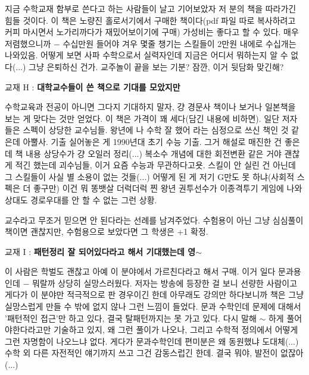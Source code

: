지금 수학교재 함부로 쓴다고 하는 사람들이 날고 기어보았자 저 분의 책을 따라가긴 힘들 것이다.
이 책은 노량진 홀로서기에서 구매한 책이다(pdf 파일 따로 복사하려고 커피 마시면서 노가리까다가 재밌어보이기에 구매)
가성비는 좋다고 할 수 있다. 매우 저렴했으니까 $-$ 수십만원 들어야 겨우 몇줄 챙기는 스킬들이 2만원 내에로 수십개는 나와있음.
어떻게 보면 사파 수학으로서 실력자인데 지금은 어디서 뭐하는지 알 수 없다(...) 그냥 은퇴하신 건가.
교주놀이 끝을 보는 기분?
잠깐, 이거 뒷담화 맞긴해?
\vspace{5mm}

교재 H : \textbf{대학교수들이 쓴 책으로 기대를 모았지만}
\vspace{5mm}

수학교육과 전공이 아니면 그다지 기대하지 말자, 걍 경문사 책이나 보거나 일본책을 보는 게 맞다는 것만 얻었다.
이 책은 가격이 꽤 세다(담긴 내용에 비하면). 일단 저자들은 스펙이 상당한 교수님들.
왕년에 나 수학 잘 했어 라는 심정으로 쓰신 책인 것 같은데 아뿔사.
기출 실어놓은 게 1990년대 초기 수능 기출. 그거 해설로 매진한 건 좋은데 책 내용 상당수가 걍 오일러 정리(...)
복소수 개념에 대한 회전변환 같은 거야 괜찮게 적긴 했는데 괴수님들, 이거 요즘 수능과 무관하다고욧.
스킬이 안 실린 건 아닌데 그 스킬들이 사실 별 소용이 없는 것들(...) 어떻게 된 게 저기 G만도 못 하냐(사회적 스펙은 더 좋구만)
이건 뭐 똥뱃살 더럭더럭 찐 왕년 권투선수가 이종격투기 게임에 나와 상대도 경로우대를 안 할 수 없는 그런 상황.
\vspace{5mm}

교수라고 무조거 믿으면 안 된다라는 선례를 남겨주었다.
수험용이 아닌 그냥 심심풀이 책이면 괜찮지만, 수험용으로 보았다면 그 학생은 +1 확정.
\vspace{5mm}

교재 I : \textbf{패턴정리 잘 되어있다라고 해서 기대했는데 영$\sim$}
\vspace{5mm}

이 사람은 학벌도 괜찮고 아예 이 분야에서 가르친다라고 해서 구매. 이거 일다 문과용인데 $-$
뭐랄까 상당히 실망스러웠다. 저자는 방송에 등장한 걸 보니 선량한 사람이고 게다가 이 분야만 적극적으로 판 경우이긴 한데
아무래도 강의만 하다보니까 책은 그냥 실망스럽게 만들 수 밖에 없지 않나 그런 느낌이 들었다.
문과 수학인데 문제에 대해서 '패턴적인 접근'만 하고 있다, 결국 탈패턴까지는 못 가고 있다.
다시 말해 $\sim$ 하게 풀어야한다라고만 기술하고 있지, 왜 그런 풀이가 나오나, 그리고 수학적 정의에서 어떻게 그런 자명함이 나오느냐 없다.
게다가 문과수학인데 편미분은 왜 동원했냐 도대체(...)
수학 외 다른 자전적인 얘기까지 쓰고 그건 감동스럽긴 한데. 결국 뭐야, 발전이 없잖아(...)
\vspace{5mm}

